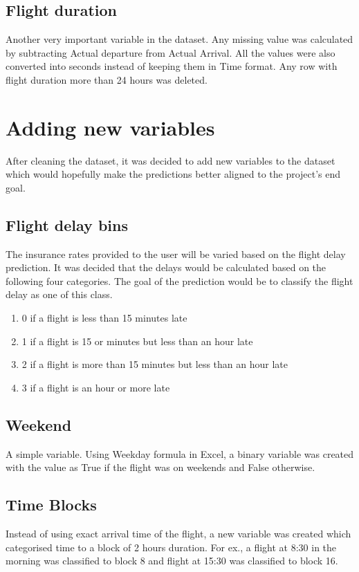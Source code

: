 \subsection{Flight duration}
Another very important variable in the dataset. Any missing value was calculated by subtracting Actual departure from Actual Arrival. All the values were also converted into seconds instead of keeping them in Time format. Any row with flight duration more than 24 hours was deleted.

\section{Adding new variables}
After cleaning the dataset, it was decided to add new variables to the dataset which would hopefully make the predictions better aligned to the project's end goal.

\subsection{Flight delay bins}
The insurance rates provided to the user will be varied based on the flight delay prediction. It was decided that the delays would be calculated based on the following four categories. The goal of the prediction would be to classify the flight delay as one of this class.
\begin{enumerate}
    \item 0 if a flight is less than 15 minutes late
    \item 1 if a flight is 15 or minutes but less than an hour late
    \item 2 if a flight is more than 15 minutes but less than an hour late
    \item 3 if a flight is an hour or more late
\end{enumerate}

\subsection{Weekend}
A simple variable. Using Weekday formula in Excel, a binary variable was created with the value as True if the flight was on weekends and False otherwise.

\subsection{Time Blocks}
Instead of using exact arrival time of the flight, a new variable was created which categorised time to a block of 2 hours duration. For ex., a flight at 8:30 in the morning was classified to block 8 and flight at 15:30 was classified to block 16.

